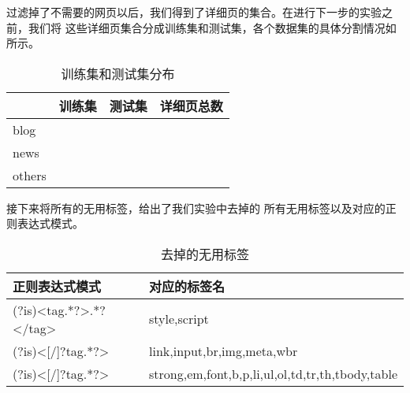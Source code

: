 过滤掉了不需要的网页以后，我们得到了详细页的集合。在进行下一步的实验之前，我们将
这些详细页集合分成训练集和测试集，各个数据集的具体分割情况如
所示。%
\begin{table}[hb]
\centering
\begin{tabular}{llll}
  \toprule
 & 训练集 & 测试集 & 详细页总数 \\
\hline
blog &  &  &  \\
news &  &  &  \\
others &  &  &  \\
\bottomrule
\end{tabular}
\caption{训练集和测试集分布}
\label{experiment:tab:split}
\end{table}
\begin{comment}
#+ORGTBL: SEND 数据分割 orgtbl-to-latex :splice nil :skip 0
|        | 训练集 | 测试集 | 详细页总数 |
|--------+--------+--------+------------|
| blog   |        |        |            |
| news   |        |        |            |
| others |        |        |            |
\end{comment}

接下来将所有的无用标签，给出了我们实验中去掉的
所有无用标签以及对应的正则表达式模式。
\begin{table}[hb]
  \centering
\begin{tabular}{ll}
  \toprule
正则表达式模式 & 对应的标签名 \\
\hline
(?is)<tag.*?>.*?</tag> & style,script \\
(?is)<[/]?tag.*?> & link,input,br,img,meta,wbr \\
(?is)<[/]?tag.*?> & strong,em,font,b,p,li,ul,ol,td,tr,th,tbody,table \\
\bottomrule
\end{tabular}
  \caption{去掉的无用标签}
  \label{experiment:tab:uselesstags}
\end{table}
\begin{comment}
#+ORGTBL: SEND 无用标签 orgtbl-to-latex :splice nil :skip 0
| 正则表达式模式         | 对应的标签名                                     |
|------------------------+--------------------------------------------------|
| (?is)<tag.*?>.*?</tag> | style,script                                     |
| (?is)<[/]?tag.*?>      | link,input,br,img,meta,wbr                       |
| (?is)<[/]?tag.*?>      | strong,em,font,b,p,li,ul,ol,td,tr,th,tbody,table |
\end{comment}

